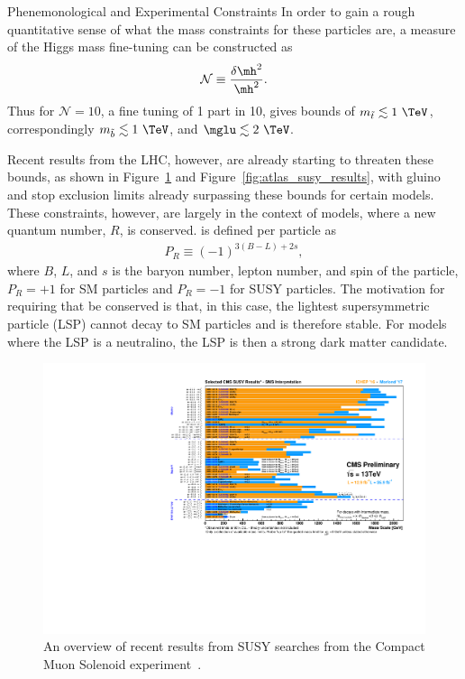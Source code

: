 \begin{section}{Phenemonological and Experimental Constraints}
In order to gain a rough quantitative sense of what the mass constraints for these particles are, a measure of the Higgs mass fine-tuning can be constructed as
\begin{align}
\mathcal{N} \equiv \frac{\delta\mh^2}{\mh^2}.
\end{align}
Thus for $\mathcal{N} = 10$, a fine tuning of 1 part in 10, gives bounds of $m_{\tilde{t}} \lesssim 1~\TeV$, correspondingly $m_{\tilde{b}} \lesssim 1~\TeV$, and $\mglu \lesssim 2~\TeV$.

Recent results from the LHC, however, are already starting to threaten these bounds, as shown in Figure~\ref{fig:cms_susy_results} and Figure~\ref{fig:atlas_susy_results}, with gluino and stop exclusion limits already surpassing these bounds for certain models.
These constraints, however, are largely in the context of \RPC models, where a new quantum number, $R$, is conserved.
\RP is defined per particle as
\begin{align}
P_R \equiv (-1)^{3(B-L)+2s},
\end{align}
where $B$, $L$, and $s$ is the baryon number, lepton number, and spin of the particle, $P_R = +1$ for SM particles and $P_R = -1$ for SUSY particles.
The motivation for requiring that \RP be conserved is that, in this case, the lightest supersymmetric particle (LSP) cannot decay to SM particles and is therefore stable.
For models where the LSP is a neutralino, the LSP is then a strong dark matter candidate.

\begin{figure}[tbp!]
\begin{center}
\includegraphics[angle=0,width=0.90\columnwidth]{fig/cms_susy_results.pdf}
\end{center}
\caption{An overview of recent results from SUSY searches from the Compact Muon Solenoid experiment~\cite{cms_susy_results}.}
\label{fig:cms_susy_results}
\end{figure}


\end{section}

